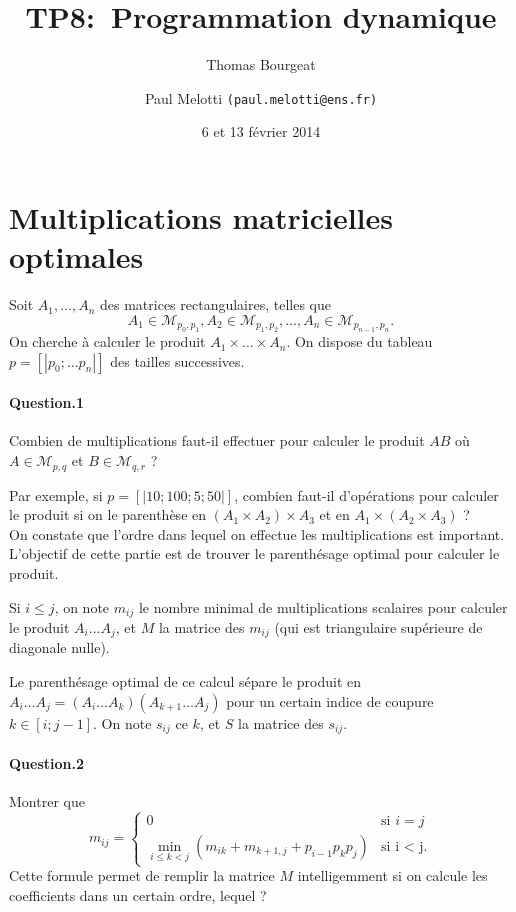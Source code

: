 \documentclass[10pt,a4paper]{article}
\begin{document}
\title{TP8: Programmation dynamique}
\author{Thomas Bourgeat \and Paul Melotti \texttt{(paul.melotti@ens.fr)}}
\date{6 et 13 février 2014}
\maketitle{}

\section{Multiplications matricielles optimales}
Soit $A_1, \dots, A_n$ des matrices rectangulaires, telles que
\[A_1\in \mathcal{M}_{p_0,p_1}, A_2\in \mathcal{M}_{p_1,p_2}, \dots, A_n\in \mathcal{M}_{p_{n-1},p_n}.\]
On cherche à calculer le produit $A_1 \times \dots \times A_n$.
On dispose du tableau $p = [|p_0 ; \dots p_n |]$ des tailles successives.

\paragraph{Question.1}

Combien de multiplications faut-il effectuer pour calculer le produit $A B$
où $A\in \mathcal{M}_{p,q}$ et $B\in \mathcal{M}_{q,r}$ ?

Par exemple, si $p=[|10;100;5;50|]$, combien faut-il d'opérations pour calculer
le produit si on le parenthèse en $(A_1 \times A_2) \times A_3$ et en 
$A_1 \times (A_2 \times A_3)$ ?
\\

On constate que l'ordre dans lequel on effectue les multiplications est 
important. L'objectif de cette partie est de trouver le parenthésage optimal pour 
calculer le produit.

Si $i \leq j$, on note $m_{ij}$ le nombre minimal de multiplications scalaires 
pour calculer le produit $A_i \dots A_j$, et $M$ la matrice des
$m_{ij}$ (qui est triangulaire supérieure de diagonale nulle).

Le parenthésage optimal de ce calcul sépare le produit en 
$A_i \dots A_j = (A_i \dots A_k) (A_{k+1} \dots A_j)$ pour un certain indice de
coupure $k\in [i;j-1]$. On note $s_{ij}$ ce $k$, et $S$ la matrice des $s_{ij}$.

\paragraph{Question.2} Montrer que 
\[m_{ij} = \left\{
	\begin{array}{ll}
		0  & \mbox{si } i=j \\
		\min_{i\leq k < j} (m_{ik} + m_{k+1,j} + p_{i-1} p_k p_j) & \mbox{si i < j}.
	\end{array}
\right.\]
Cette formule permet de remplir la matrice $M$ intelligemment si on calcule les
coefficients dans un certain ordre, lequel ?
\end{document}
